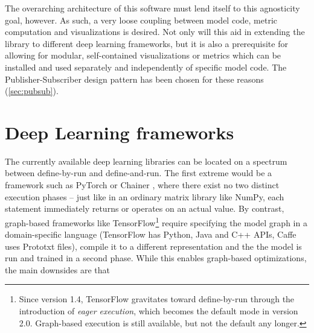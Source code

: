 The overarching architecture of this software must lend itself to this
agnosticity goal, however. As such, a very loose coupling between model code,
metric computation and visualizations is desired. Not only will this aid in
extending the library to different deep learning frameworks, but it is also a
prerequisite for allowing for modular, self-contained visualizations or metrics
which can be installed and used separately and independently of specific model
code. The Publisher-Subscriber design pattern has been chosen for these reasons
(\cref{sec:pubsub}).

\hypertarget{sec:dl-frameworks}{%
\section{Deep Learning frameworks}\label{sec:dl-frameworks}}

The currently available deep learning libraries can be located on a spectrum
between define-by-run and define-and-run.  The first extreme would be a
framework such as PyTorch \citep{paszke2017automatic} or Chainer
\citep{tokui2015chainer} , where there exist no two distinct execution phases --
just like in an ordinary matrix library like NumPy, each statement immediately
returns or operates on an actual value. By contrast, graph-based frameworks like
TensorFlow\footnote{Since version 1.4, TensorFlow gravitates toward
    define-by-run through the introduction of \emph{eager execution}, which
becomes the default mode in version 2.0. Graph-based execution is still
available, but not the default any longer.} require specifying the model graph
in a domain-specific language (TensorFlow has Python, Java and C++ APIs, Caffe
uses Prototxt files), compile it to a different representation and the the model
is run and trained in a second phase. While this enables graph-based
optimizations, the main downsides are that

